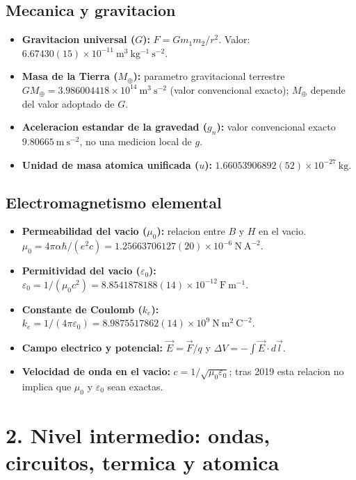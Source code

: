 \documentclass[11pt,a4paper]{article}
\begin{document}
\subsection*{Mecanica y gravitacion}

\begin{itemize}
  \item \textbf{Gravitacion universal ($G$):} $F=Gm_1m_2/r^2$. Valor: $6.67430(15)\times10^{-11}\ \mathrm{m^3\ kg^{-1}\ s^{-2}}$.
  \item \textbf{Masa de la Tierra ($M_\oplus$):} parametro gravitacional terrestre $GM_\oplus=3.986004418\times10^{14}\ \mathrm{m^3\ s^{-2}}$ (valor convencional exacto); $M_\oplus$ depende del valor adoptado de $G$.
  \item \textbf{Aceleracion estandar de la gravedad ($g_n$):} valor convencional exacto $9.80665\ \mathrm{m\ s^{-2}}$, no una medicion local de $g$.
  \item \textbf{Unidad de masa atomica unificada ($u$):} $1.66053906892(52)\times10^{-27}\ \mathrm{kg}$.
\end{itemize}

\subsection*{Electromagnetismo elemental}

\begin{itemize}
  \item \textbf{Permeabilidad del vacio ($\mu_0$):} relacion entre $B$ y $H$ en el vacio. $\mu_0=4\pi\alpha\hbar/(e^2c)=1.25663706127(20)\times10^{-6}\ \mathrm{N\ A^{-2}}$.
  \item \textbf{Permitividad del vacio ($\varepsilon_0$):} $\varepsilon_0=1/(\mu_0c^2)=8.8541878188(14)\times10^{-12}\ \mathrm{F\ m^{-1}}$.
  \item \textbf{Constante de Coulomb ($k_e$):} $k_e=1/(4\pi\varepsilon_0)=8.9875517862(14)\times10^9\ \mathrm{N\ m^2\ C^{-2}}$.
  \item \textbf{Campo electrico y potencial:} $\vec E=\vec F/q$ y $\Delta V=-\int\vec E\cdot d\vec l$.
  \item \textbf{Velocidad de onda en el vacio:} $c=1/\sqrt{\mu_0\varepsilon_0}$; tras 2019 esta relacion no implica que $\mu_0$ y $\varepsilon_0$ sean exactas.
\end{itemize}

\section*{2. Nivel intermedio: ondas, circuitos, termica y atomica}
\end{document}
